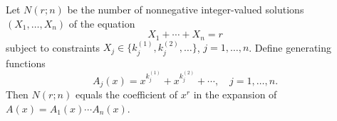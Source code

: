 Let $N(r; n)$ be the number of nonnegative integer-valued solutions $(X_1, \ldots, X_n)$ of the equation
$$X_1 + \cdots + X_n = r$$
subject to constraints $X_j \in \{k_j^{(1)}, k_j^{(2)}, \ldots\}$, $j = 1, \ldots, n$. Define generating functions
$$A_j(x) = x^{k_j^{(1)}} + x^{k_j^{(2)}} + \cdots, \quad j = 1, \ldots, n.$$
Then $N(r; n)$ equals the coefficient of $x^r$ in the expansion of $A(x) = A_1(x) \cdots A_n(x)$.
